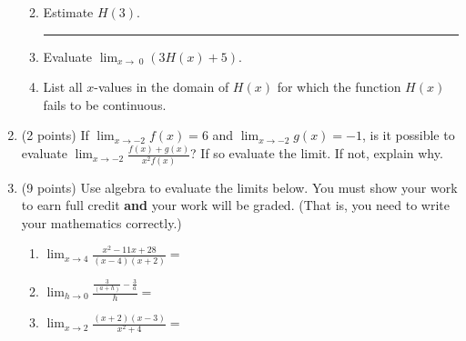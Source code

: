 \documentclass[12pt]{article}
\renewcommand{\emph}[1]{\textsf{\textbf{#1}}}
\newcommand{\blank}[1]{\rule{#1}{0.5pt}}
\newcommand{\mblank}[1]{\underline{\hspace{#1}}}
\renewcommand{\d}{\displaystyle}
\begin{document}
\begin{enumerate}
\begin{enumerate}
\vspace{0.1in}
\vspace{0.1in}
\item Estimate $H(3).$ \blank{.5in}
\vspace{0.1in}
\item Evaluate $\d{\lim_{x \to\; 0} ( 3H(x) +5)}.$ \hrulefill
\vspace{0.1in}
\item List all $x$-values in the domain of $H(x)$ for which the function $H(x)$ fails to be continuous.\\
\vfill

\end{enumerate}

\item (2 points)  If $\d \lim_{x \to -2} f(x) =6$ and $\d \lim_{x \to -2} g(x) =-1$, is it possible to evaluate $\d \lim_{x \to -2} \frac{f(x) + g(x)}{x^{2} f(x)}$? If so evaluate the limit. If not, explain why.
\vspace{1in}

\newpage

\item (9 points) Use algebra to evaluate the limits below. You must show your work to earn full credit \emph{and} your work will be graded. (That is, you need to write your mathematics correctly.)
	\begin{enumerate}
	\item $\d \lim_{x \to 4} \frac{x^2-11 x+28}{(x-4)(x+2)}=$
	\vfill
	\item $\d \lim_{h \to 0} \frac{\frac{3}{(a+h)}-\frac{3}{a}}{h}=$
	\vfill
	\item $\d \lim_{x\to2} \frac{(x+2)(x-3)}{x^{2}+4}=$
	\vfill
	\end{enumerate}
	

\end{enumerate}
\end{document}
